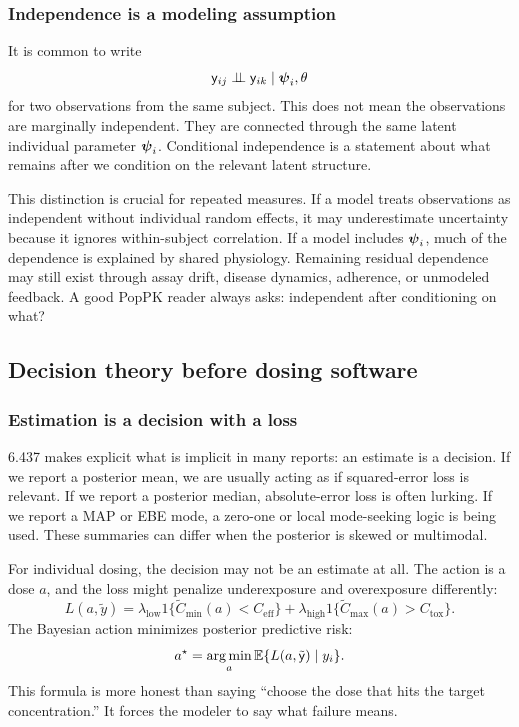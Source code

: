 \subsubsection*{Independence is a modeling assumption}

It is common to write
\[
  \mathsf{y}_{ij}\perp\!\!\!\perp \mathsf{y}_{ik}\mid \boldsymbol{\psi}_i,\theta
\]
for two observations from the same subject.  This does not mean the observations are marginally independent.  They are connected through the same latent individual parameter \(\boldsymbol{\psi}_i\).  Conditional independence is a statement about what remains after we condition on the relevant latent structure.

This distinction is crucial for repeated measures.  If a model treats observations as independent without individual random effects, it may underestimate uncertainty because it ignores within-subject correlation.  If a model includes \(\boldsymbol{\psi}_i\), much of the dependence is explained by shared physiology.  Remaining residual dependence may still exist through assay drift, disease dynamics, adherence, or unmodeled feedback.  A good PopPK reader always asks: independent after conditioning on what?

\subsection{Decision theory before dosing software}

\subsubsection*{Estimation is a decision with a loss}

6.437 makes explicit what is implicit in many reports: an estimate is a decision.  If we report a posterior mean, we are usually acting as if squared-error loss is relevant.  If we report a posterior median, absolute-error loss is often lurking.  If we report a MAP or EBE mode, a zero-one or local mode-seeking logic is being used.  These summaries can differ when the posterior is skewed or multimodal.

For individual dosing, the decision may not be an estimate at all.  The action is a dose \(a\), and the loss might penalize underexposure and overexposure differently:
\[
  L(a,\tilde y)
  =
  \lambda_{\mathrm{low}}1\{\tilde C_{\min}(a)<C_{\mathrm{eff}}\}
  +
  \lambda_{\mathrm{high}}1\{\tilde C_{\max}(a)>C_{\mathrm{tox}}\}.
\]
The Bayesian action minimizes posterior predictive risk:
\[
  a^\star
  =
  \operatorname*{arg\,min}_a \mathbb{E}\{L(a,\tilde{\mathsf{y}})\mid y_i\}.
\]
This formula is more honest than saying ``choose the dose that hits the target concentration.''  It forces the modeler to say what failure means.

